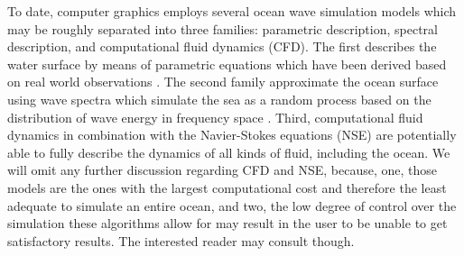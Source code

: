 To date, computer graphics employs several ocean wave simulation models which
may be roughly separated into three families: parametric description, spectral
description, and computational fluid dynamics (CFD). The first describes the water
surface by means of parametric equations which have been derived based on real
world observations \citep{Gerstner:1809,Rankine:1863,Biesel:1952}.
The second family approximate the ocean surface using wave spectra which
simulate the sea as a random process based on the distribution of wave energy
in frequency space \citep{book:kinsman2002wind,article:PiersonMoskowitz1964,
article:Hasselman1973,article:Donelan1985,article:Elfouhaily1997}.
Third, computational fluid dynamics in combination with the Navier-Stokes
equations (NSE) are potentially able to fully describe the dynamics of all kinds of
fluid, including the ocean. We will omit any further discussion regarding CFD and NSE,
because, one, those models are the ones with the largest computational cost and therefore
the least adequate to simulate an entire ocean, and two,
the low degree of control over the simulation these algorithms allow for
may result in the user to be unable to get satisfactory results.
The interested reader may consult \cite{Bridson:2015,egstar:2014} though.


%
